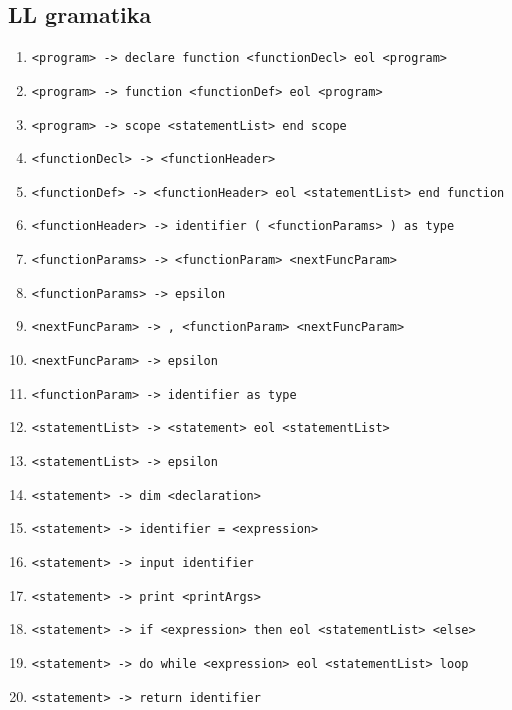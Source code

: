 \documentclass{article}
\begin{document}
        \subsection{LL gramatika}
            \begin{enumerate}
                \item \texttt{<program> -> declare function <functionDecl> eol <program>}
                \item \texttt{<program> -> function <functionDef> eol <program>}
                \item \texttt{<program> -> scope <statementList> end scope}
                
                \item \texttt{<functionDecl> -> <functionHeader>}
                \item \texttt{<functionDef> -> <functionHeader> eol <statementList> end function}
                
                \item \texttt{<functionHeader> -> identifier ( <functionParams> ) as type}
                
                \item \texttt{<functionParams> -> <functionParam> <nextFuncParam>}
                \item \texttt{<functionParams> -> epsilon}
                
                \item \texttt{<nextFuncParam> -> , <functionParam> <nextFuncParam>}
                \item \texttt{<nextFuncParam> -> epsilon}
                
                \item \texttt{<functionParam> -> identifier as type}
                
                \item \texttt{<statementList> -> <statement> eol <statementList>}
                \item \texttt{<statementList> -> epsilon}
                
                \item \texttt{<statement> -> dim <declaration>}
                \item \texttt{<statement> -> identifier = <expression>}
                \item \texttt{<statement> -> input identifier}
                \item \texttt{<statement> -> print <printArgs>}
                \item \texttt{<statement> -> if <expression> then eol <statementList> <else>}
                \item \texttt{<statement> -> do while <expression> eol <statementList> loop}
                \item \texttt{<statement> -> return identifier}
                

\end{enumerate}
\end{document}
